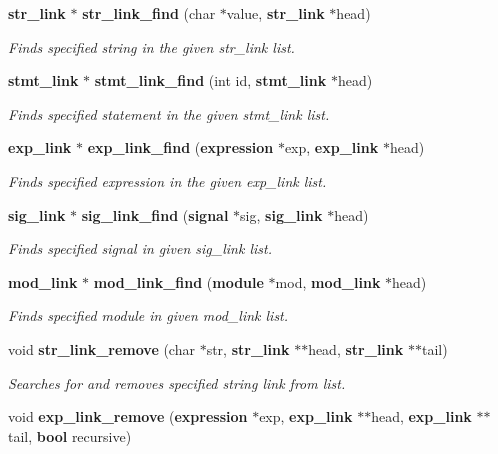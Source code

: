 \begin{CompactItemize}
{\bf str\_\-link} $\ast$ {\bf str\_\-link\_\-find} (char $\ast$value, {\bf str\_\-link} $\ast$head)
\begin{CompactList}\small\item\em Finds specified string in the given str\_\-link list. \item\end{CompactList}\item 
{\bf stmt\_\-link} $\ast$ {\bf stmt\_\-link\_\-find} (int id, {\bf stmt\_\-link} $\ast$head)
\begin{CompactList}\small\item\em Finds specified statement in the given stmt\_\-link list. \item\end{CompactList}\item 
{\bf exp\_\-link} $\ast$ {\bf exp\_\-link\_\-find} ({\bf expression} $\ast$exp, {\bf exp\_\-link} $\ast$head)
\begin{CompactList}\small\item\em Finds specified expression in the given exp\_\-link list. \item\end{CompactList}\item 
{\bf sig\_\-link} $\ast$ {\bf sig\_\-link\_\-find} ({\bf signal} $\ast$sig, {\bf sig\_\-link} $\ast$head)
\begin{CompactList}\small\item\em Finds specified signal in given sig\_\-link list. \item\end{CompactList}\item 
{\bf mod\_\-link} $\ast$ {\bf mod\_\-link\_\-find} ({\bf module} $\ast$mod, {\bf mod\_\-link} $\ast$head)
\begin{CompactList}\small\item\em Finds specified module in given mod\_\-link list. \item\end{CompactList}\item 
void {\bf str\_\-link\_\-remove} (char $\ast$str, {\bf str\_\-link} $\ast$$\ast$head, {\bf str\_\-link} $\ast$$\ast$tail)
\begin{CompactList}\small\item\em Searches for and removes specified string link from list. \item\end{CompactList}\item 
void {\bf exp\_\-link\_\-remove} ({\bf expression} $\ast$exp, {\bf exp\_\-link} $\ast$$\ast$head, {\bf exp\_\-link} $\ast$$\ast$tail, {\bf bool} recursive)

\end{CompactItemize}
